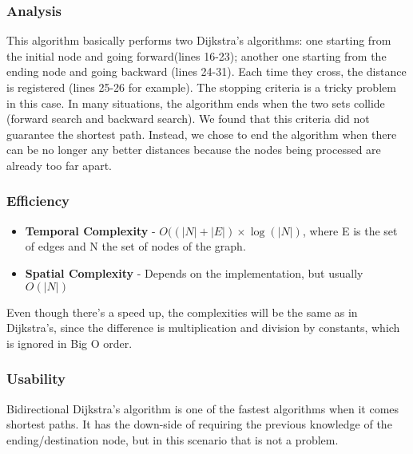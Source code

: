 \subsubsection{Analysis}
This algorithm basically performs two Dijkstra's algorithms: one starting from the initial node and going forward(lines 16-23); another one starting from the ending node and going backward (lines 24-31). Each time they cross, the distance is registered (lines 25-26 for example). The stopping criteria is a tricky problem in this case. In many situations, the algorithm ends when the two sets collide (forward search and backward search). We found that this criteria did not guarantee the shortest path. Instead, we chose to end the algorithm when there can be no longer any better distances because the nodes being processed are already too far apart.

\subsubsection{Efficiency}
\begin{itemize}
    \item \textbf{Temporal Complexity} - $ O((|N|+|E|) \times \log(|N|) $, where E is the set of edges and N the set of nodes of the graph.
    \item \textbf{Spatial Complexity} - Depends on the implementation, but usually $ O(|N|) $
\end{itemize}
Even though there's a speed up, the complexities will be the same as in Dijkstra's, since the difference is multiplication and division by constants, which is ignored in Big O order.

\subsubsection{Usability}
Bidirectional Dijkstra's algorithm is one of the fastest algorithms when it comes shortest paths. It has the down-side of requiring the previous knowledge of the ending/destination node, but in this scenario that is not a problem.


